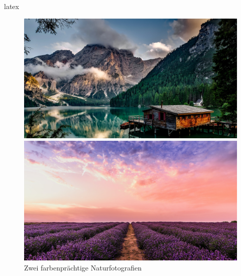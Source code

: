 \begin{showcase}
    \begin{code}{latex}
        \begin{figure}
            \centering
            \begin{minipage}[c]{0.49\columnwidth}
                \includegraphics[width=\linewidth]{assets/images/bilder/pexels-pixabay-147411.jpg}
            \end{minipage}
            \hfill
            \begin{minipage}[c]{0.49\columnwidth}
                \includegraphics[width=\linewidth]{assets/images/bilder/pexels-david-bartus-1166209.jpg}
            \end{minipage}
            \caption{Zwei farbenprächtige Naturfotografien}
        \end{figure}
    \end{code}
    \tcblower
    \begin{center}
        \captionsetup{type=figure}
        \begin{subfigure}{0.49\columnwidth}

\end{subfigure}
\end{center}
\end{showcase}
